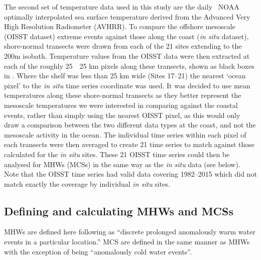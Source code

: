 \documentclass[a4paper,10pt,review]{elsarticle}
\begin{document}
The second set of temperature data used in this study are the daily \degree~NOAA optimally interpolated sea surface temperature \citep[OISST;][]{Reynolds2007} derived from the Advanced Very High Resolution Radiometer (AVHRR). To compare the offshore mesoscale (OISST dataset) extreme events against those along the coast (\emph{in situ} dataset), shore-normal transects were drawn from each of the 21 sites extending to the 200m isobath. Temperature values from the OISST data were then extracted at each of the roughly 25~\texttimes~25 km pixels along these transects, shown as black boxes in . Where the shelf was less than 25 km wide (Sites 17--21) the nearest `ocean pixel' to the \emph{in situ} time series coordinate was used. It was decided to use mean temperatures along these shore-normal transects as they better represent the mesoscale temperatures we were interested in comparing against the coastal events, rather than simply using the nearest OISST pixel, as this would only draw a comparison between the two different data types at the coast, and not the mesoscale activity in the ocean. The individual time series within each pixel of each transects were then averaged to create 21 time series to match against those calculated for the \emph{in situ} sites. These 21 OISST time series could then be analysed for MHWs (MCSs) in the same way as the \emph{in situ} data (see below). Note that the OISST time series had valid data covering 1982--2015 which did not match exactly the coverage by individual \emph{in situ} sites.

\subsection{Defining and calculating MHWs and MCSs}
MHWs are defined here following \citet{Hobday2016} as ``discrete prolonged anomalously warm water events in a particular location.'' MCS are defined in the same manner as MHWs with the exception of being ``anomalously cold water events''.
\end{document}
